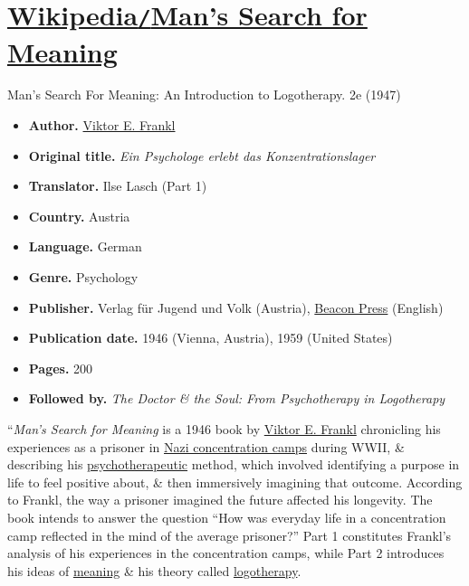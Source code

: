 \documentclass[oneside]{book}
\numberwithin{equation}{section}
\begin{document}

\section{\href{https://en.wikipedia.org/wiki/Man's_Search_for_Meaning}{Wikipedia\texttt{/}Man's Search for Meaning}}
\textsf{Man's Search For Meaning: An Introduction to Logotherapy}. 2e (1947)
\begin{itemize}
	\item \textbf{Author.} \href{https://en.wikipedia.org/wiki/Viktor_Frankl}{Viktor E. Frankl}
	\item \textbf{Original title.} \textit{Ein Psychologe erlebt das Konzentrationslager}
	\item \textbf{Translator.} Ilse Lasch (Part 1)
	\item \textbf{Country.} Austria
	\item \textbf{Language.} German
	\item \textbf{Genre.} Psychology
	\item \textbf{Publisher.} Verlag f\"ur Jugend und Volk (Austria), \href{https://en.wikipedia.org/wiki/Beacon_Press}{Beacon Press} (English)
	\item \textbf{Publication date.} 1946 (Vienna, Austria), 1959 (United States)
	\item \textbf{Pages.} 200
	\item \textbf{Followed by.} \textit{The Doctor \& the Soul: From Psychotherapy in Logotherapy}
\end{itemize}
``\textit{Man's Search for Meaning} is a 1946 book by \href{https://en.wikipedia.org/wiki/Viktor_Frankl}{Viktor E. Frankl} chronicling his experiences as a prisoner in \href{https://en.wikipedia.org/wiki/Nazi_concentration_camps}{Nazi concentration camps} during WWII, \& describing his \href{https://en.wikipedia.org/wiki/Psychotherapeutic}{psychotherapeutic} method, which involved identifying a purpose in life to feel positive about, \& then immersively imagining that outcome. According to Frankl, the way a prisoner imagined the future affected his longevity. The book intends to answer the question ``How was everyday life in a concentration camp reflected in the mind of the average prisoner?'' Part 1 constitutes Frankl's analysis of his experiences in the concentration camps, while Part 2 introduces his ideas of \href{https://en.wikipedia.org/wiki/Meaning_(existential)}{meaning} \& his theory called \href{https://en.wikipedia.org/wiki/Logotherapy}{logotherapy}.
\end{document}
